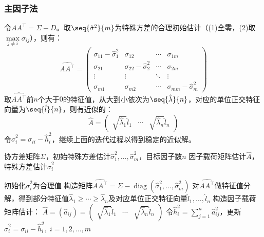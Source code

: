 \subsubsection{主因子法}
\begin{method}
	令$AA^{\top}=\Sigma-D$。取$\seq{\hat{\sigma}^2}{m}$为特殊方差的合理初始估计（(1)全零，(2)取$\max\limits_{j\ne i}\sigma_{ij}$），则有：
	\begin{equation*}
		\widehat{AA^{\top}}=
		\begin{pmatrix}
			\sigma_{11}-\hat{\sigma}_1^2 & \sigma_{12} & \cdots & \sigma_{1m} \\
			\sigma_{21} & \sigma_{22}-\hat{\sigma}_2^2 & \cdots & \sigma_{2m} \\
			\vdots & \vdots & \ddots & \vdots \\
			\sigma_{m1} & \sigma_{m2} & \cdots & \sigma_{mm}-\hat{\sigma}_m^2
		\end{pmatrix}
	\end{equation*}
	取$\widehat{AA^{\top}}$前$n$个大于$0$的特征值，从大到小依次为$\seq{\hat{\lambda}}{n}$，对应的单位正交特征向量为$\seq{\hat{l}}{n}$，则有近似的：
	\begin{equation*}
		\hat{A}=
		\begin{pmatrix}
			\sqrt{\hat{\lambda}_1}\hat{l}_1 & \cdots & \sqrt{\hat{\lambda}_n}\hat{l}_n
		\end{pmatrix}
	\end{equation*}
	令$\hat{\sigma}_i^2=\sigma_{ii}-\hat{h}_i^2$，继续上面的迭代过程以得到稳定的近似解。
\end{method}
\begin{algorithm}[H]
	\caption{主因子法求解因子分析}
	\label{alg:PrincipalFactorMethod}
	\begin{algorithmic}[1]
		\Require 协方差矩阵$\Sigma$，初始特殊方差估计$\hat{\sigma}^2_1,\dots,\hat{\sigma}^2_m$，目标因子数$n$
		\Ensure 因子载荷矩阵估计$\hat{A}$，特殊方差估计$\hat{\sigma}_i^2$
		
		\State 初始化$\hat{\sigma}_i^2$为合理值
		\Repeat
			\State 构造矩阵$\widehat{AA^{\top}}=\Sigma-\operatorname{diag}(\hat{\sigma}_1^2,\dots,\hat{\sigma}_m^2)$
			\State 对$\widehat{AA^{\top}}$做特征值分解，得到部分特征值$\hat{\lambda}_1\geqslant\cdots\geqslant\hat{\lambda}_n$及对应单位正交特征向量$\hat{l}_1,\dots,\hat{l}_n$
			\State 构造因子载荷矩阵估计：
			$
			\hat{A}=(\hat{a}_{ij})=\begin{pmatrix}
				\sqrt{\hat{\lambda}_1}\hat{l}_1 & \cdots & \sqrt{\hat{\lambda}_n}\hat{l}_n
			\end{pmatrix}
			$
			\State 令$\hat{h}_i^2=\sum\limits_{j=1}^n\hat{a}_{ij}^2$，更新$\hat{\sigma}_i^2=\sigma_{ii}-\hat{h}_i^2,\;i=1,2,\dots,m$
	\end{algorithmic}
\end{algorithm}
